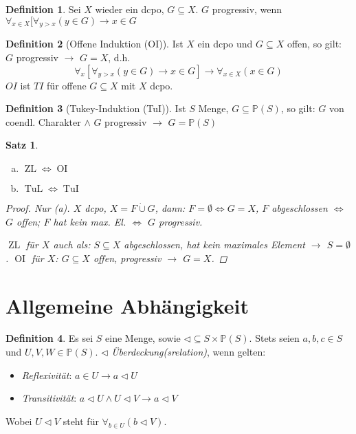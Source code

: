 \documentclass[headsepline=true,DIV=11]{scrartcl}
\newtheorem*{theorem}{Satz}
\theoremstyle{definition}
\newtheorem*{definition}{Definition}
\newcommand{\ZL}{\operatorname{ZL}}
\newcommand{\OI}{\operatorname{OI}}
\newcommand{\TuL}{\operatorname{TuL}}
\newcommand{\TuI}{\operatorname{TuI}}
\begin{document}
\begin{definition}
	Sei $X$ wieder ein dcpo, $G\subseteq X$.
	$G$ progressiv, wenn $\forall_{x\in X} [\forall_{y>x}(y\in G)\to x\in G$
\end{definition}

\begin{definition}[Offene Induktion (OI)]
	Ist $X$ ein dcpo und $G\subseteq X$ offen, so gilt: $G$ progressiv $\to$ $G=X$, d.h.
	\[\forall_x[\forall_{y>x}(y\in G)\to x\in G]\to \forall_{x\in X}(x\in G)\]
	$OI$ ist $TI$ für offene $G\subseteq X$ mit $X$ dcpo.
\end{definition}

\begin{definition}[Tukey-Induktion (TuI)]
	Ist $S$ Menge, $G\subseteq\mathbb P(S)$, so gilt:
	$G$ von coendl. Charakter $\land$ $G$ progressiv $\to$ $G=\mathbb P(S)$
\end{definition}

\begin{theorem}
	\begin{enumerate}[(a)]
		\item $\ZL \iff \OI$
		\item $\TuL \iff \TuI$
	\end{enumerate}
	\begin{proof}
		Nur (a).
		$X$ dcpo, $X=F\dot\cup G$, dann: $F=\emptyset\iff G=X$, 
		$F$ abgeschlossen $\iff$ $G$ offen;
		$F$ hat kein max. El. $\iff$ $G$ progressiv.
		
		$\ZL$ für $X$ auch als: $S\subseteq X$ abgeschlossen, hat kein maximales Element $\to$ $S=\emptyset$.
		$\OI$ für $X$: $G\subseteq X$ offen, progressiv $\to$ $G=X$.
	\end{proof}
\end{theorem}

\section*{Allgemeine Abhängigkeit}

\begin{definition}
	Es sei $S$ eine Menge, sowie $\lhd\subseteq S\times \mathbb P(S)$.
	Stets seien $a, b, c\in S$ und $U, V, W\in \mathbb P(S)$.
	$\lhd$ {\em Überdeckung(srelation)}, wenn gelten:
	\begin{itemize}
		\item {\em Reflexivität}: $a\in U\to a\lhd U$
		\item {\em Transitivität}: $ a\lhd U \land U\lhd V \to a\lhd V$
	\end{itemize}
	Wobei $U\lhd V$ steht für $\forall_{b\in U}(b\lhd V)$. %
	
\end{definition}
\end{document}
